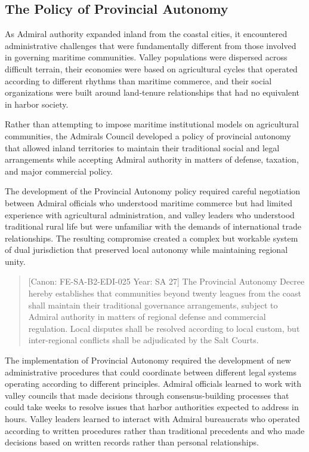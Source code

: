 \subsection{The Policy of Provincial
Autonomy}\label{the-policy-of-provincial-autonomy}

As Admiral authority expanded inland from the coastal cities, it
encountered administrative challenges that were fundamentally different
from those involved in governing maritime communities. Valley
populations were dispersed across difficult terrain, their economies
were based on agricultural cycles that operated according to different
rhythms than maritime commerce, and their social organizations were
built around land-tenure relationships that had no equivalent in harbor
society.

Rather than attempting to impose maritime institutional models on
agricultural communities, the Admiral\textquotesingle s Council
developed a policy of provincial autonomy that allowed inland
territories to maintain their traditional social and legal arrangements
while accepting Admiral authority in matters of defense, taxation, and
major commercial policy.

The development of the Provincial Autonomy policy required careful
negotiation between Admiral officials who understood maritime commerce
but had limited experience with agricultural administration, and valley
leaders who understood traditional rural life but were unfamiliar with
the demands of international trade relationships. The resulting
compromise created a complex but workable system of dual jurisdiction
that preserved local autonomy while maintaining regional unity.

\begin{quote}
{[}Canon: FE-SA-B2-EDI-025 \textbar{} Year: SA 27{]} The Provincial
Autonomy Decree hereby establishes that communities beyond twenty
leagues from the coast shall maintain their traditional governance
arrangements, subject to Admiral authority in matters of regional
defense and commercial regulation. Local disputes shall be resolved
according to local custom, but inter-regional conflicts shall be
adjudicated by the Salt Courts.
\end{quote}

The implementation of Provincial Autonomy required the development of
new administrative procedures that could coordinate between different
legal systems operating according to different principles. Admiral
officials learned to work with valley councils that made decisions
through consensus-building processes that could take weeks to resolve
issues that harbor authorities expected to address in hours. Valley
leaders learned to interact with Admiral bureaucrats who operated
according to written procedures rather than traditional precedents and
who made decisions based on written records rather than personal
relationships.

